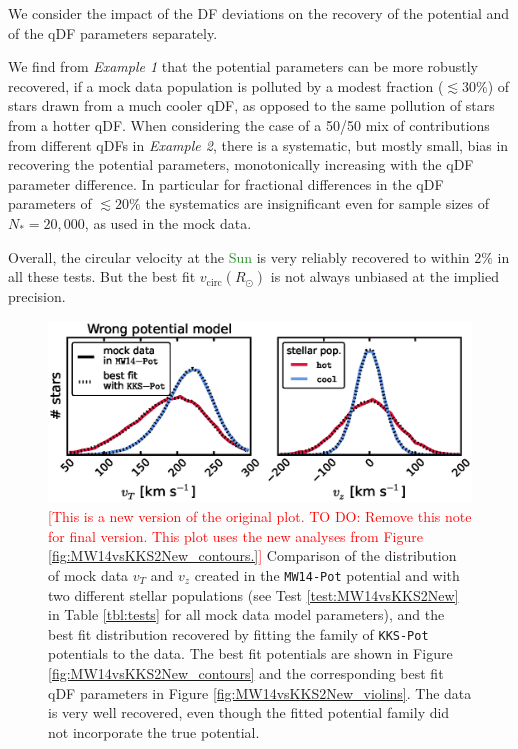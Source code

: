 \documentclass[iop,revtex4]{emulateapj}
\newcommand{\NEW}[1]{\textcolor{ForestGreen}{#1}}
\newcommand{\NOTE}[1]{\textcolor{Red}{#1}}
\newcommand{\OLD}[1]{}
\begin{document}
We consider the impact of the DF deviations on the recovery of the potential and of the qDF parameters separately. 

We find from \emph{Example 1} that the potential parameters can be more robustly recovered, if a mock data population is polluted by a modest fraction ($\lesssim 30\%$) of stars drawn from a much cooler qDF, as opposed to the same pollution of stars from a hotter qDF. When considering the case of a 50/50 mix of contributions from different qDFs in \emph{Example 2}, there is a systematic, but mostly small, bias in recovering the potential parameters, monotonically increasing with the qDF parameter difference. In particular for fractional differences in the qDF parameters of $\lesssim 20\%$ the systematics are insignificant even for sample sizes of $N_{*} = 20,000$, as used in the mock data.

Overall, the circular velocity at the \OLD{sun}\NEW{Sun} is very reliably recovered to within $2\%$ in all these tests. But the best fit $v_\text{circ}(R_\odot)$ is not always unbiased at the implied precision.

\begin{figure}[!htbp]
\centering
\includegraphics[width=\columnwidth]{figs/MW14vsKKS2New_mockdata_residuals.eps}
\caption{\NOTE{[This is a new version of the original plot. TO DO: Remove this note for final version. This plot uses the new analyses from Figure \ref{fig:MW14vsKKS2New_contours.}]} Comparison of the distribution of mock data $v_T$ and $v_z$ created in the \texttt{MW14-Pot} potential and with two different stellar populations (see Test \ref{test:MW14vsKKS2New} in Table \ref{tbl:tests} for all mock data model parameters), and the best fit distribution recovered by fitting the family of \texttt{KKS-Pot} potentials to the data. The best fit potentials are shown in Figure \ref{fig:MW14vsKKS2New_contours} and the corresponding best fit qDF parameters in Figure \ref{fig:MW14vsKKS2New_violins}. The data is very well recovered, even though the fitted potential family did not incorporate the true potential.}
\label{fig:MW14vsKKS2New_mockdata_residuals}
\end{figure}
\end{document}
